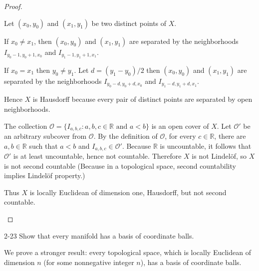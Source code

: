 \begin{proof}
\begin{enumerate}[label={(\alph*)}]
		      Let $(x_{0}, y_{0})$ and $(x_{1}, y_{1})$ be two distinct points of $X$.

		      If $x_{0}\ne x_{1}$, then $(x_{0}, y_{0})$ and $(x_{1}, y_{1})$ are separated by the neighborhoods $I_{y_{0}-1, y_{0}+1, x_{0}}$ and $I_{y_{1}-1, y_{1}+1, x_{1}}$.

		      If $x_{0} = x_{1}$ then $y_{0}\ne y_{1}$. Let $d = (y_{1} - y_{0})/2$ then $(x_{0}, y_{0})$ and $(x_{1}, y_{1})$ are separated by the neighborhoods $I_{y_{0} - d, y_{0}+d, x_{0}}$ and $I_{y_{1}-d, y_{1}+d, x_{1}}$.

		      Hence $X$ is Hausdorff because every pair of distinct points are separated by open neighborhoods.

		      The collection $\mathcal{O} = \{ I_{a,b,c}: a, b, c\in\mathbb{R} \text{ and } a < b \}$ is an open cover of $X$. Let $\mathcal{O}'$ be an arbitrary subcover from $\mathcal{O}$. By the definition of $\mathcal{O}$, for every $c\in\mathbb{R}$, there are $a, b\in\mathbb{R}$ such that $a < b$ and $I_{a,b,c}\in\mathcal{O}'$. Because $\mathbb{R}$ is uncountable, it follows that $\mathcal{O}'$ is at least uncountable, hence not countable. Therefore $X$ is not Lindelöf, so $X$ is not second countable (Because in a topological space, second countability implies Lindelöf property.)

		      Thus $X$ is locally Euclidean of dimension one, Hausdorff, but not second countable.
	\end{enumerate}
\end{proof}

\begin{problem}{2-23}\label{problem:2-23}
Show that every manifold has a basis of coordinate balls.
\end{problem}

\begin{note}
    We prove a stronger result: every topological space, which is locally Euclidean of dimension $n$ (for some nonnegative integer $n$), has a basis of coordinate balls.
\end{note}

